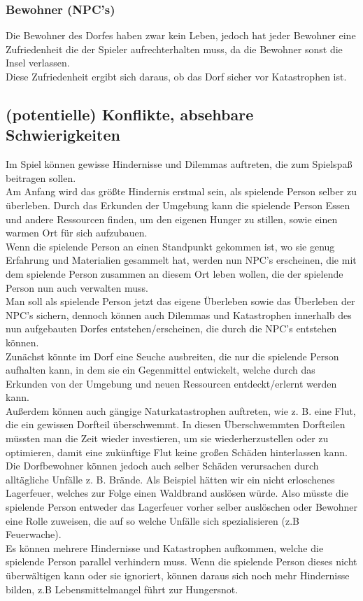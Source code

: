 \documentclass[paper=A4,pagesize=auto,12pt,headinclude=true,footinclude=true,BCOR=0mm,DIV=calc]{scrartcl}
\newcommand{\sectionspace}{
	\vspace{0.5cm}
}
\begin{document}
\subsubsection{Bewohner (NPC's)}
Die Bewohner des Dorfes haben zwar kein Leben, jedoch hat jeder Bewohner eine Zufriedenheit die der Spieler aufrechterhalten muss, da die Bewohner sonst die Insel verlassen.\\
Diese Zufriedenheit ergibt sich daraus, ob das Dorf sicher vor Katastrophen ist.

\sectionspace
\subsection{(potentielle) Konflikte, absehbare Schwierigkeiten}\label{sec:Konflikte}

Im Spiel können gewisse Hindernisse und Dilemmas auftreten, die zum Spielspaß beitragen sollen.\\

Am Anfang wird das größte Hindernis erstmal sein, als spielende Person selber zu überleben.
Durch das Erkunden der Umgebung kann die spielende Person Essen und andere Ressourcen finden, um den eigenen Hunger zu stillen, sowie einen warmen Ort für sich aufzubauen.\\
Wenn die spielende Person an einen Standpunkt gekommen ist, wo sie genug Erfahrung und Materialien gesammelt hat, werden nun NPC’s erscheinen, die mit dem spielende Person zusammen an diesem Ort leben wollen, die der spielende Person nun auch verwalten muss.\\
Man soll als spielende Person jetzt das eigene Überleben sowie das Überleben der NPC’s sichern, dennoch können auch Dilemmas und Katastrophen innerhalb des nun aufgebauten Dorfes entstehen/erscheinen, die durch die NPC’s entstehen können.\\
Zunächst könnte im Dorf eine Seuche ausbreiten, die nur die spielende Person aufhalten kann, in dem sie ein Gegenmittel entwickelt, welche durch das Erkunden von der Umgebung und neuen Ressourcen entdeckt/erlernt werden kann. \\
Außerdem können auch gängige Naturkatastrophen auftreten, wie z. B. eine Flut, die ein gewissen Dorfteil überschwemmt. In diesen Überschwemmten Dorfteilen müssten man die Zeit wieder investieren, um sie wiederherzustellen oder zu optimieren, damit eine zukünftige Flut keine großen Schäden hinterlassen kann.\\
Die Dorfbewohner können jedoch auch selber Schäden verursachen durch alltägliche Unfälle z. B. Brände. Als Beispiel hätten wir ein nicht erloschenes Lagerfeuer, welches zur Folge einen Waldbrand auslösen würde. Also müsste die spielende Person entweder das Lagerfeuer vorher selber auslöschen oder Bewohner eine Rolle zuweisen, die auf so welche Unfälle sich spezialisieren (z.B Feuerwache). \\
Es können mehrere Hindernisse und Katastrophen aufkommen, welche die spielende Person parallel verhindern muss. Wenn die spielende Person dieses nicht überwältigen kann oder sie ignoriert, können daraus sich noch mehr Hindernisse bilden, z.B Lebensmittelmangel führt zur Hungersnot.
\sectionspace
\end{document}
